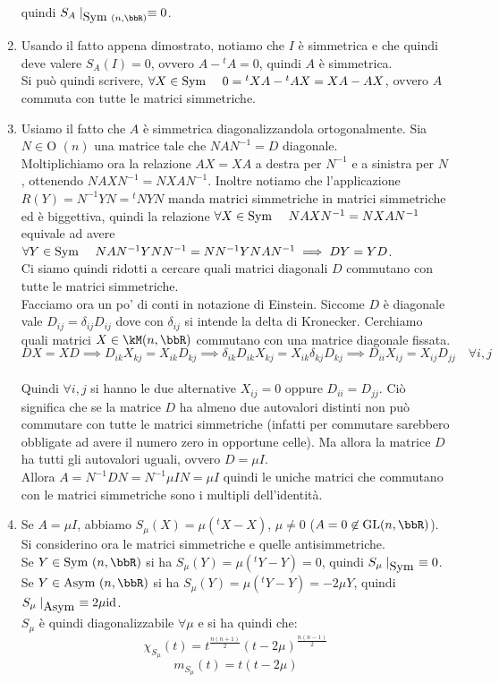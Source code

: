 \documentclass[a4paper,NoNotes,GeneralMath]{stdmdoc}
\begin{document}
\begin{enumerate}
				quindi $S_A\mid_{\Symm(n,\bbR)} \equiv 0$.
		\item Usando il fatto appena dimostrato, notiamo che $I$ è simmetrica e che quindi deve valere $S_A(I) = 0$, ovvero $A - {}^tA = 0$, quindi $A$ è simmetrica. \\
			Si può quindi scrivere, $\forall X \in \mbox{Sym } \quad 0 = {}^tXA - {}^tAX = XA - AX$, ovvero $A$ commuta con tutte le matrici simmetriche.
		\item Usiamo il fatto che $A$ è simmetrica diagonalizzandola ortogonalmente. Sia $N \in \text{O }(n)$ una matrice tale che $NAN^{-1} = D$ diagonale. \\
			Moltiplichiamo ora la relazione $AX = XA$ a destra per $N^{-1}$ e a sinistra per $N$, ottenendo $NAXN^{-1} = NXAN^{-1}$. Inoltre notiamo che l'applicazione $R(Y) = N^{-1} Y N = {}^tN Y N$ manda matrici simmetriche in
				matrici simmetriche ed è biggettiva, quindi la relazione $\forall X \in \mbox{Sym } \quad NAXN^{-1} = NXAN^{-1}$ equivale ad avere $\forall Y \in \mbox{Sym } \quad NAN^{-1}YNN^{-1} = NN^{-1}YNAN^{-1} \implies DY = YD$. \\
			Ci siamo quindi ridotti a cercare quali matrici diagonali $D$ commutano con tutte le matrici simmetriche. \\
			Facciamo ora un po' di conti in notazione di Einstein. Siccome $D$ è diagonale vale $D_{ij} = \delta_{ij}D_{ij}$ dove con $\delta_{ij}$ si intende la delta di Kronecker. Cerchiamo quali matrici $X \in \kM(n, \bbR)$ commutano
				con una matrice diagonale fissata. $$DX = XD \implies D_{ik}X_{kj} = X_{ik}D_{kj} \implies \delta_{ik}D_{ik}X_{kj} = X_{ik}\delta_{kj}D_{kj} \implies D_{ii}X_{ij} = X_{ij}D_{jj} \quad \forall i, j$$ \\
				Quindi $\forall i,j$ si hanno le due alternative $X_{ij} = 0$ oppure $D_{ii} = D_{jj}$. Ciò significa che se la matrice $D$ ha almeno due autovalori distinti non può commutare con tutte le matrici simmetriche
				(infatti per commutare sarebbero obbligate ad avere il numero zero in opportune celle). Ma allora la matrice $D$ ha tutti gli autovalori uguali, ovvero $D = \mu I$. \\
			Allora $A = N^{-1}DN = N^{-1} \mu I N = \mu I$ quindi le uniche matrici che commutano con le matrici simmetriche sono i multipli dell'identità.
		\item Se $A = \mu I$, abbiamo $S_\mu (X) = \mu ({}^tX - X)$, $\mu \neq 0$ ($A = 0 \not\in \GL(n, \bbR)$). Si considerino ora le matrici simmetriche e quelle antisimmetriche. \\
			Se $Y \in \Symm(n, \bbR)$ si ha $S_\mu (Y) = \mu ({}^tY - Y) = 0$, quindi $S_\mu\mid_{\mbox{Sym }} \equiv 0$. Se $Y \in \Asymm(n, \bbR)$ si ha $S_\mu(Y) = \mu ({}^tY - Y) = - 2\mu Y$,
				quindi $S_\mu\mid_{\mbox{Asym }} \equiv 2\mu \mbox{id}$. \\
			$S_\mu$ è quindi diagonalizzabile $\forall \mu$ e si ha quindi che: $$\chi_{S_\mu} (t) = t^{\frac{n(n+1)}{2}}(t-2\mu)^{\frac{n(n-1)}{2}}$$ $$m_{S_\mu} (t) = t (t-2\mu)$$
	\end{enumerate}
	
\end{document}
